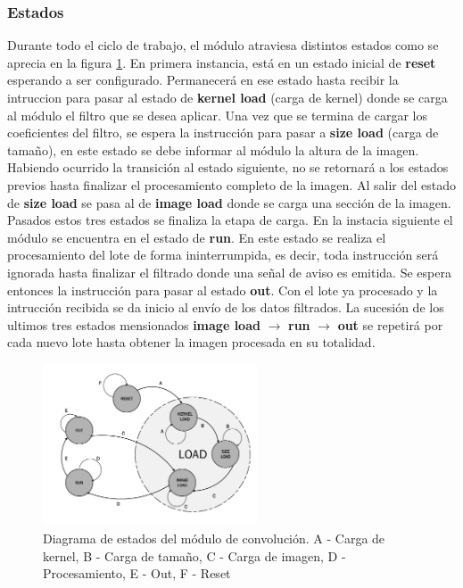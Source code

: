 \documentclass[conference,compsoc]{IEEEtran}
\begin{document}
\subsubsection{Estados}
Durante todo el ciclo de trabajo, el m\'odulo atraviesa distintos estados como
se aprecia en la figura \ref{state}. En primera instancia, est\'a en un estado
inicial de \textbf{reset} esperando a ser configurado. Permanecer\'a en ese
estado hasta recibir la intruccion para pasar al estado de \textbf{kernel load}
(carga de kernel) donde se carga al m\'odulo el filtro que se desea aplicar. Una
vez que se termina de cargar los coeficientes 
del filtro, se espera la instrucci\'on para pasar a \textbf{size load} (carga
de tama\~no), en este estado se debe informar al m\'odulo la altura de la
imagen. Habiendo ocurrido la transici\'on al estado siguiente, no se retornar\'a
a los estados previos hasta finalizar el procesamiento completo de la imagen.
Al salir del estado de \textbf{size load} se pasa al de \textbf{image load}
donde se carga una secci\'on de la imagen. Pasados estos tres estados se
finaliza la etapa de carga. En la instacia siguiente el m\'odulo se encuentra en
el estado de \textbf{run}. En este estado se realiza el procesamiento del lote
de forma ininterrumpida, es decir, toda instrucci\'on ser\'a ignorada hasta
finalizar el filtrado donde una se\~nal de aviso es emitida. Se espera entonces
la instrucci\'on para pasar al estado \textbf{out}. Con el lote ya procesado y
la intrucci\'on recibida se da inicio al env\'io de los datos filtrados. La
sucesi\'on de los ultimos tres estados mensionados \textbf{image load}
$\rightarrow$ \textbf{run} $\rightarrow$ \textbf{out} se repetir\'a por cada
nuevo lote hasta obtener la imagen procesada en su totalidad.

\begin{figure}[!t]
  \centering
  \includegraphics[width=2.5in]{states.pdf}
  \caption{Diagrama de estados del m\'odulo de convoluci\'on.
    A - Carga de kernel, B - Carga de tama\~no, C - Carga de imagen, D -
    Procesamiento, E - Out, F - Reset}
  \label{state}
\end{figure}
\end{document}
